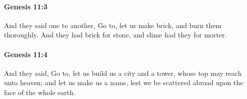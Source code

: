 		\paragraph{Genesis 11:3} %
			\label{GENESIS-11-3}

			And they said one to another, Go to, let us make brick, and burn them thoroughly. And they had brick for stone, and slime had they for morter.


		\paragraph{Genesis 11:4} %
			\label{GENESIS-11-4}

			And they said, Go to, let us build us a city and a tower, whose top may reach unto heaven; and let us make us a name, lest we be scattered abroad upon the face of the whole earth.


